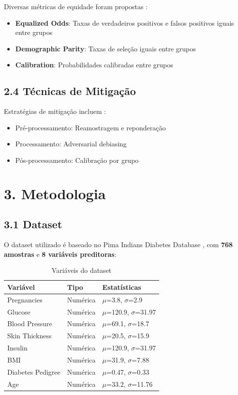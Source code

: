 \documentclass[12pt,a4paper]{article}
\begin{document}
Diversas métricas de equidade foram propostas \cite{corbett2018}:
\begin{itemize}
    \item \textbf{Equalized Odds}: Taxas de verdadeiros positivos e falsos 
          positivos iguais entre grupos
    \item \textbf{Demographic Parity}: Taxas de seleção iguais entre grupos
    \item \textbf{Calibration}: Probabilidades calibradas entre grupos
\end{itemize}

\subsection{2.4 Técnicas de Mitigação}

Estratégias de mitigação incluem \cite{friedler2019}:
\begin{itemize}
    \item Pré-processamento: Reamostragem e reponderação
    \item Processamento: Adversarial debiasing
    \item Pós-processamento: Calibração por grupo
\end{itemize}

\section{3. Metodologia}

\subsection{3.1 Dataset}

O dataset utilizado é baseado no Pima Indians Diabetes Database 
\cite{smith1988}, com \textbf{768 amostras} e \textbf{8 variáveis preditoras}:

\begin{table}[H]
\centering
\caption{Variáveis do dataset}
\begin{tabular}{lll}
\toprule
\textbf{Variável} & \textbf{Tipo} & \textbf{Estatísticas} \\
\midrule
Pregnancies & Numérica & $\mu$=3.8, $\sigma$=2.9 \\
Glucose & Numérica & $\mu$=120.9, $\sigma$=31.97 \\
Blood Pressure & Numérica & $\mu$=69.1, $\sigma$=18.7 \\
Skin Thickness & Numérica & $\mu$=20.5, $\sigma$=15.9 \\
Insulin & Numérica & $\mu$=120.9, $\sigma$=31.97 \\
BMI & Numérica & $\mu$=31.9, $\sigma$=7.88 \\
Diabetes Pedigree & Numérica & $\mu$=0.47, $\sigma$=0.33 \\
Age & Numérica & $\mu$=33.2, $\sigma$=11.76 \\
\bottomrule
\end{tabular}
\label{tab:variables}
\end{table}
\end{document}

